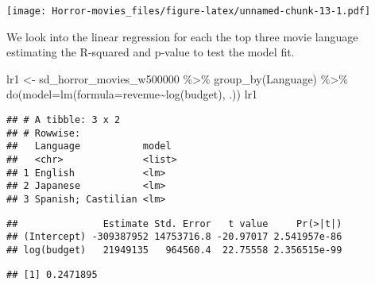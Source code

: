\documentclass[
]{article}
\newenvironment{Shaded}{\begin{snugshade}}{\end{snugshade}}
\newcommand{\AttributeTok}[1]{\textcolor[rgb]{0.77,0.63,0.00}{#1}}
\newcommand{\DecValTok}[1]{\textcolor[rgb]{0.00,0.00,0.81}{#1}}
\newcommand{\FunctionTok}[1]{\textcolor[rgb]{0.00,0.00,0.00}{#1}}
\newcommand{\NormalTok}[1]{#1}
\newcommand{\OtherTok}[1]{\textcolor[rgb]{0.56,0.35,0.01}{#1}}
\newcommand{\SpecialCharTok}[1]{\textcolor[rgb]{0.00,0.00,0.00}{#1}}
\begin{document}
\texttt{[image: Horror-movies\_files/figure-latex/unnamed-chunk-13-1.pdf]}

We look into the linear regression for each the top three movie language
estimating the R-squared and p-value to test the model fit.

\begin{Shaded}
\begin{Highlighting}[]
\NormalTok{lr1 }\OtherTok{\textless{}{-}}\NormalTok{ sd\_horror\_movies\_w500000 }\SpecialCharTok{\%\textgreater{}\%} \FunctionTok{group\_by}\NormalTok{(Language) }\SpecialCharTok{\%\textgreater{}\%} \FunctionTok{do}\NormalTok{(}\AttributeTok{model=}\FunctionTok{lm}\NormalTok{(}\AttributeTok{formula=}\NormalTok{revenue}\SpecialCharTok{\textasciitilde{}}\FunctionTok{log}\NormalTok{(budget), .))}
\NormalTok{lr1}
\end{Highlighting}
\end{Shaded}

\begin{verbatim}
## # A tibble: 3 x 2
## # Rowwise: 
##   Language           model 
##   <chr>              <list>
## 1 English            <lm>  
## 2 Japanese           <lm>  
## 3 Spanish; Castilian <lm>
\end{verbatim}

\begin{Shaded}
\end{Shaded}

\begin{verbatim}
##               Estimate Std. Error   t value     Pr(>|t|)
## (Intercept) -309387952 14753716.8 -20.97017 2.541957e-86
## log(budget)   21949135   964560.4  22.75558 2.356515e-99
\end{verbatim}

\begin{Shaded}
\end{Shaded}

\begin{verbatim}
## [1] 0.2471895
\end{verbatim}
\end{document}
